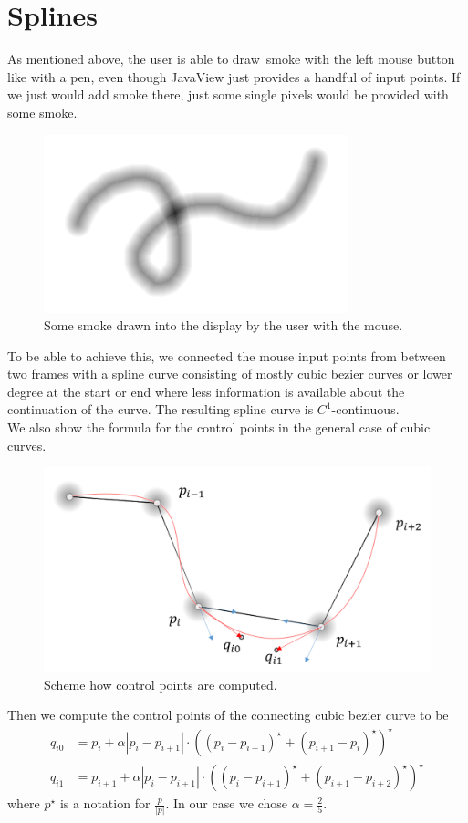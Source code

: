 \documentclass[a4paper,10pt,oneside,final,german,openbib,pdftex,titlepage]{scrbook}
\begin{document}
\section{Splines}\label{splinesChapter}
As mentioned above, the user is able to \grqq draw\grqq~smoke with the left mouse button like with a pen, even though JavaView just provides a handful of input points. If we just would add smoke there, just some single pixels would be provided with some smoke.\\

\begin{figure}[H]
 \centering
 \includegraphics[scale=0.8]{images/SmokeTrace.png}
 \caption{Some smoke drawn into the display by the user with the mouse.}
 \label{SmokeTrace}
\end{figure}
To be able to achieve this, we connected the mouse input points from between two frames with a spline curve consisting of mostly cubic bezier curves or lower degree at the start or end where less information is available about the continuation of the curve. The resulting spline curve is $C^1$-continuous.\\

We also show the formula for the control points in the general case of cubic curves.
\begin{figure}[H]
 \centering
 \includegraphics[scale=0.3]{images/SplinesScheme.png}
 \caption{Scheme how control points are computed.}
 \label{SplinesScheme}
\end{figure}
Then we compute the control points of the connecting cubic bezier curve to be
\begin{align*}
q_{i0} & = p_i + \alpha |p_i-p_{i+1}| \cdot \left((p_i-p_{i-1})^{\star} + (p_{i+1}-p_i)^{\star}\right)^{\star} \\
q_{i1} & = p_{i+1} + \alpha |p_i-p_{i+1}| \cdot \left((p_i-p_{i+1})^{\star} + (p_{i+1}-p_{i+2})^{\star}\right)^{\star}
\end{align*}
where $p^{\star}$ is a notation for $\frac{p}{|p|}$. In our case we chose $\alpha = \frac{2}{5}$. 
\end{document}
